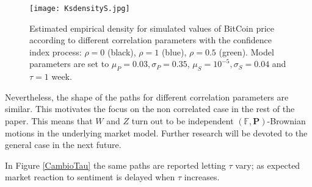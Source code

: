 \documentclass[12pt,centertags,reqno]{amsart}
\numberwithin{equation}{section} \makeatletter
\def \P {\mathbf P}
\def \bF {\mathbb F}
\begin{document}
\begin{figure}[htbp]
\texttt{[image: KsdensityS.jpg]} 
\caption{Estimated empirical density for simulated values of BitCoin price according to different correlation parameters with the confidence index process:  $\rho=0$ (black), $\rho=1$ (blue), $\rho=0.5$  (green). Model parameters are set to $\mu_P=0.03,\sigma_P=0.35$, $\mu_S=10^{-5},\sigma_S=0.04$ and $\tau=1$ week.}\label{KSdensity}
\end{figure}
Nevertheless, the shape of the paths for different correlation parameters are similar. This motivates the focus on the non correlated case in the rest of the paper. This means that
$W$ and $Z$ turn out to be independent $(\bF,\P)$-Brownian motions in the underlying market model. Further research will be devoted to the general case in the next future. 

In Figure \ref{CambioTau} the same paths are reported letting $\tau$ vary; as expected market reaction to sentiment is delayed when $\tau$ increases. 
\end{document}
